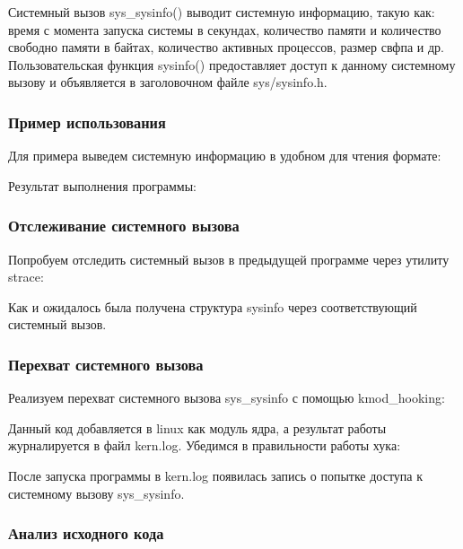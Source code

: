 \documentclass[14pt,a4paper,report]{report}
\begin{document}
Системный вызов sys\_sysinfo() выводит системную информацию, такую как: время с момента запуска системы в секундах, количество памяти и количество свободно памяти в байтах, количество активных процессов, размер свфпа и др. Пользовательская функция sysinfo() предоставляет доступ к данному системному вызову и объявляется в заголовочном файле sys/sysinfo.h.

\subsubsection{Пример использования}

Для примера выведем системную информацию в удобном для чтения формате:



Результат выполнения программы:



\subsubsection{Отслеживание системного вызова}

Попробуем отследить системный вызов в предыдущей программе через утилиту strace:



Как и ожидалось была получена структура sysinfo через соответствующий системный вызов.

\subsubsection{Перехват системного вызова}

Реализуем перехват системного вызова sys\_sysinfo с помощью kmod\_hooking:



Данный код добавляется в linux как модуль ядра, а результат работы журналируется в файл kern.log. Убедимся в правильности работы хука:



После запуска программы в kern.log появилась запись о попытке доступа к системному вызову sys\_sysinfo.

\subsubsection{Анализ исходного кода}
\end{document}
